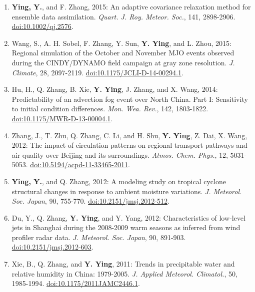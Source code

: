 \begin{enumerate}
\item \textbf{Ying, Y.}, and F. Zhang, 2015: An adaptive covariance relaxation method for ensemble data assimilation. 
\textit{Quart. J. Roy. Meteor. Soc.}, 141, 2898-2906. 
\href{https://doi.org/10.1002/qj.2576}{doi:10.1002/qj.2576}.

\item Wang, S., A. H. Sobel, F. Zhang, Y. Sun, \textbf{Y. Ying}, and L. Zhou, 2015: Regional simulation of the October and November MJO events observed during the CINDY/DYNAMO field campaign at gray zone resolution. 
\textit{J. Climate}, 28, 2097-2119. 
\href{https://doi.org/10.1175/JCLI-D-14-00294.1}{doi:10.1175/JCLI-D-14-00294.1}.

\item Hu, H., Q. Zhang, B. Xie, \textbf{Y. Ying}, J. Zhang, and X. Wang, 2014: Predictability of an advection fog event over North China. Part I: Sensitivity to initial condition differences. 
\textit{Mon. Wea. Rev.}, 142, 1803-1822. 
\href{https://doi.org/10.1175/MWR-D-13-00004.1}{doi:10.1175/MWR-D-13-00004.1}.

\item Zhang, J., T. Zhu, Q. Zhang, C. Li, and H. Shu, \textbf{Y. Ying}, Z. Dai, X. Wang, 2012: The impact of circulation patterns on regional transport pathways and air quality over Beijing and its surroundings. 
\textit{Atmos. Chem. Phys.}, 12, 5031-5053. 
\href{https://doi.org/10.5194/acpd-11-33465-2011}{doi:10.5194/acpd-11-33465-2011}.

\item \textbf{Ying, Y.}, and Q. Zhang, 2012: A modeling study on tropical cyclone structural changes in response to ambient moisture variations. 
\textit{J. Meteorol. Soc. Japan}, 90, 755-770. 
\href{https://doi.org/10.2151/jmsj.2012-512}{doi:10.2151/jmsj.2012-512}.

\item Du, Y., Q. Zhang, \textbf{Y. Ying}, and Y. Yang, 2012: Characteristics of low-level jets in Shanghai during the 2008-2009 warm seasons as inferred from wind profiler radar data. 
\textit{J. Meteorol. Soc. Japan}, 90, 891-903. 
\href{https://doi.org/10.2151/jmsj.2012-603}{doi:10.2151/jmsj.2012-603}.

\item Xie, B., Q. Zhang, and \textbf{Y. Ying}, 2011: Trends in precipitable water and relative humidity in China: 1979-2005. 
\textit{J. Applied Meteorol. Climatol.}, 50, 1985-1994. 
\href{https://doi.org/10.1175/2011JAMC2446.1}{doi:10.1175/2011JAMC2446.1}.

\end{enumerate}
